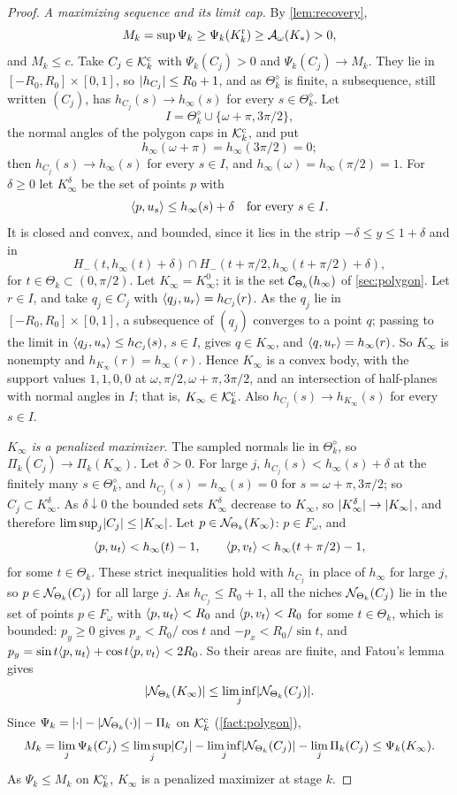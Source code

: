 \begin{proof}
\emph{A maximizing sequence and its limit cap.} By \cref{lem:recovery},
\[
  M_k=\sup\Psi_k\ge\Psi_k(K^{\mathrm r}_k)\ge\mathcal{A}_\omega(K_*)>0,
\]
and $M_k\le c$. Take $C_j\in\mathcal{K}^{\mathrm{c}}_k$ with $\Psi_k(C_j)>0$ and $\Psi_k(C_j)\to
M_k$. They lie in $[-R_0,R_0]\times[0,1]$, so $\lvert h_{C_j}\rvert\le R_0+1$, and as
$\Theta_k^\diamond$ is finite, a subsequence, still written $(C_j)$, has
$h_{C_j}(s)\to h_\infty(s)$ for every $s\in\Theta_k^\diamond$. Let
\[
  I=\Theta_k^\diamond\cup\{\omega+\pi,3\pi/2\},
\]
the normal angles of the polygon caps in $\mathcal{K}^{\mathrm{c}}_k$, and put
\[
  h_\infty(\omega+\pi)=h_\infty(3\pi/2)=0;
\]
then $h_{C_j}(s)\to h_\infty(s)$ for every $s\in I$, and
$h_\infty(\omega)=h_\infty(\pi/2)=1$. For $\delta\ge0$ let $K_\infty^\delta$ be
the set of points $p$ with
\[
  \langle p,u_s\rangle\le h_\infty(s)+\delta\quad\text{for every }s\in I.
\]
It is closed and convex, and bounded, since it lies in the strip $-\delta\le
y\le1+\delta$ and in
\[
  H_-(t,h_\infty(t)+\delta)\cap H_-(t+\pi/2,h_\infty(t+\pi/2)+\delta),
\]
for $t\in\Theta_k\subset(0,\pi/2)$. Let $K_\infty=K_\infty^0$; it is the set
$\mathcal{C}_{\Theta_k}(h_\infty)$ of \cref{sec:polygon}. Let $r\in I$, and take $q_j\in
C_j$ with $\langle q_j,u_r\rangle=h_{C_j}(r)$. As the $q_j$ lie in
$[-R_0,R_0]\times[0,1]$, a subsequence of $(q_j)$ converges to a point $q$;
passing to the limit in $\langle q_j,u_s\rangle\le h_{C_j}(s)$, $s\in I$, gives $q\in
K_\infty$, and $\langle q,u_r\rangle=h_\infty(r)$. So $K_\infty$ is nonempty and
$h_{K_\infty}(r)=h_\infty(r)$. Hence $K_\infty$ is a convex body, with the
support values $1,1,0,0$ at $\omega,\pi/2,\omega+\pi,3\pi/2$, and an
intersection of half-planes with normal angles in $I$; that is,
$K_\infty\in\mathcal{K}^{\mathrm{c}}_k$. Also $h_{C_j}(s)\to h_{K_\infty}(s)$ for every $s\in I$.

\emph{$K_\infty$ is a penalized maximizer.} The sampled normals lie in
$\Theta_k^\diamond$, so $\Pi_k(C_j)\to\Pi_k(K_\infty)$. Let $\delta>0$. For
large $j$, $h_{C_j}(s)<h_\infty(s)+\delta$ at the finitely many
$s\in\Theta_k^\diamond$, and $h_{C_j}(s)=h_\infty(s)=0$ for
$s=\omega+\pi,3\pi/2$; so $C_j\subset K_\infty^\delta$. As $\delta\downarrow0$
the bounded sets $K_\infty^\delta$ decrease to $K_\infty$, so
$\lvert K_\infty^\delta\rvert\to\lvert K_\infty\rvert$, and therefore
$\limsup_j\lvert C_j\rvert\le\lvert K_\infty\rvert$. Let $p\in\mathcal{N}_{\Theta_k}(K_\infty)$: $p\in
F_\omega$, and
\[
  \langle p,u_t\rangle<h_\infty(t)-1,\qquad \langle p,v_t\rangle<h_\infty(t+\pi/2)-1,
\]
for some $t\in\Theta_k$. These strict inequalities hold with $h_{C_j}$ in place
of $h_\infty$ for large $j$, so $p\in\mathcal{N}_{\Theta_k}(C_j)$ for all large $j$. As
$h_{C_j}\le R_0+1$, all the niches $\mathcal{N}_{\Theta_k}(C_j)$ lie in the set of
points $p\in F_\omega$ with $\langle p,u_t\rangle<R_0$ and $\langle p,v_t\rangle<R_0$ for some
$t\in\Theta_k$, which is bounded: $p_y\ge0$ gives $p_x<R_0/\cos t$ and
$-p_x<R_0/\sin t$, and $p_y=\sin t\langle p,u_t\rangle+\cos t\langle p,v_t\rangle<2R_0$. So their
areas are finite, and Fatou's lemma gives
\[
  \lvert \mathcal{N}_{\Theta_k}(K_\infty)\rvert\le\liminf_j\lvert \mathcal{N}_{\Theta_k}(C_j)\rvert.
\]
Since $\Psi_k=\lvert \cdot\rvert-\lvert \mathcal{N}_{\Theta_k}(\cdot)\rvert-\Pi_k$ on $\mathcal{K}^{\mathrm{c}}_k$
(\cref{fact:polygon}),
\[
  M_k=\lim_j\Psi_k(C_j)\le\limsup_j\lvert C_j\rvert-\liminf_j\lvert \mathcal{N}_{\Theta_k}(C_j)\rvert
    -\lim_j\Pi_k(C_j)\le\Psi_k(K_\infty).
\]
As $\Psi_k\le M_k$ on $\mathcal{K}^{\mathrm{c}}_k$, $K_\infty$ is a penalized maximizer at stage $k$.


\end{proof}
